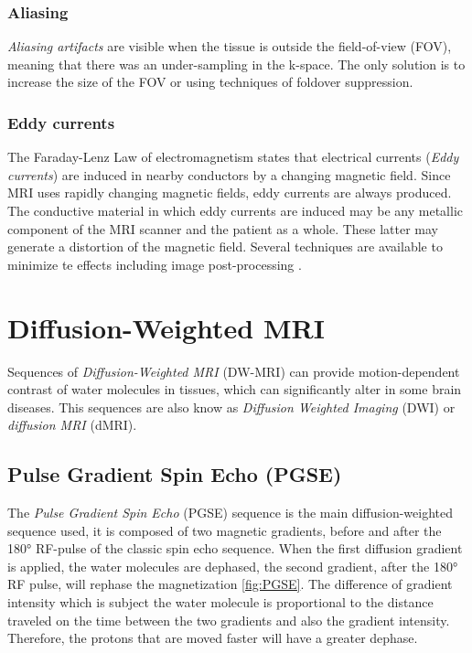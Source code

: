   \subsubsection*{Aliasing}
  \emph{Aliasing artifacts} are visible when the tissue is outside the field-of-view (FOV), meaning that there was an under-sampling in the k-space. The only solution is to increase the size of the FOV or using techniques of foldover suppression.
  \subsubsection*{Eddy currents}
  The Faraday-Lenz Law of electromagnetism states that electrical currents (\emph{Eddy currents}) are induced in nearby conductors by a changing magnetic field. Since MRI uses rapidly changing magnetic fields, eddy currents are always produced. The conductive material in which eddy currents are induced may be any metallic component of the MRI scanner and the patient as a whole. These latter may generate a distortion of the magnetic field. Several techniques are available to minimize te effects including image post-processing \cite{QeA_MRI}.

  \begin{figure}[h]
     \centering
     \caption{}
     \label{fig:artifacts}
  \end{figure}

\section{Diffusion-Weighted MRI}
 Sequences of \emph{Diffusion-Weighted MRI} (DW-MRI) can provide motion-dependent contrast of water molecules in tissues, which can significantly alter in some brain diseases. This sequences are also know as \emph{Diffusion Weighted Imaging} (DWI) or \emph{diffusion MRI} (dMRI). 
 \subsection{Pulse Gradient Spin Echo (PGSE)}
 The \emph{Pulse Gradient Spin Echo} (PGSE) sequence is the main diffusion-weighted sequence used, it is composed of two magnetic gradients, before and after the 180° RF-pulse of the classic spin echo sequence. When the first diffusion gradient is applied, the water molecules are dephased, the second gradient, after the 180° RF pulse, will rephase the magnetization \ref{fig:PGSE}. The difference of gradient intensity which is subject the water molecule is proportional to the distance traveled on the time between the two gradients and also the gradient intensity. Therefore, the protons that are moved faster will have a greater dephase.

